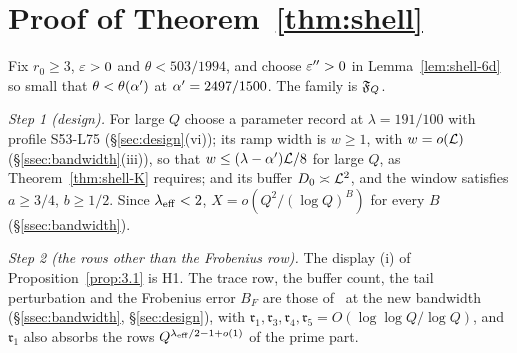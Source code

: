 \section{Proof of Theorem~\ref{thm:shell}}\label{sec:proof}

Fix $r_0\ge3$, $\varepsilon>0$ and $\theta<503/1994$, and choose $\varepsilon''>0$ in Lemma~\ref{lem:shell-6d} so small that $\theta<\theta(\alpha')$ at
$\alpha'=2497/1500$. The family is $\mathfrak F_Q$.

\emph{Step 1 (design).} For large $Q$ choose a parameter record at $\lambda=191/100$ with profile S53-L75 (\S\ref{sec:design}(vi)); its ramp width is $w\ge1$, with $w=o(\mathcal L)$ (\S\ref{ssec:bandwidth}(iii)), so that $w\le(\lambda-\alpha')\mathcal L/8$ for large $Q$, as
Theorem~\ref{thm:shell-K} requires; and
its buffer $D_0\asymp\mathcal L^2$, and the window satisfies $a\ge3/4$, $b\ge1/2$. Since $\lambda_{\rm eff}<2$, $X=o(Q^2/(\log Q)^B)$ for every $B$ (\S\ref{ssec:bandwidth}).

\emph{Step 2 (the rows other than the Frobenius row).} The display (i) of Proposition~\ref{prop:3.1} is H1. The trace row, the buffer count, the tail
perturbation and the Frobenius error $B_F$ are those of~\cite[\S\S7--10]{DSouza} at the new bandwidth (\S\ref{ssec:bandwidth}, \S\ref{sec:design}), with
$\mathfrak r_1,\mathfrak r_3,\mathfrak r_4,\mathfrak r_5=O(\log\log Q/\log Q)$, and $\mathfrak r_1$ also absorbs the rows $Q^{\lambda_{\rm eff}/2-1+o(1)}$ of the prime part.

